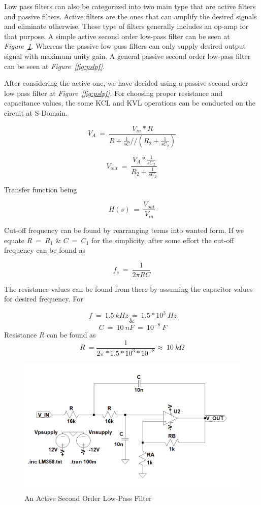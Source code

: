 \documentclass[paper]{IEEEtran}
\begin{document}
	Low pass filters can also be categorized into two main type that are active filters and passive filters. Active filters are the ones that can amplify the desired signals and eliminate otherwise. These type of filters generally includes an op-amp for that purpose.  A simple active second order low-pass filter can be seen at \textit{Figure~\ref{fig:lpf}}. Whereas the passive low pass filters can only supply desired output signal with maximum unity gain. A general passive second order low-pass filter can be seen at \textit{Figure~\ref{fig:pslpf}}.  		 

	After considering the active one, we have decided using a passive second order low pass filter at \textit{Figure~\ref{fig:pslpf}}. For choosing proper resistance and capacitance values, the some KCL and KVL operations can be conducted on the circuit at S-Domain.
	
	$$	V_A~=~\frac{V_{in}*R}{R+\frac{1}{sC}//(R_2+\frac{1}{sC_2})}	$$  	
	
	$$	V_{out}~=~\frac{V_A*\frac{1}{sC_2}}{R_2+\frac{1}{sC_2}}	$$	

	Transfer function being	
	
	$$ H(s)~=~\frac{V_{out}}{V_{in}}$$
	
	Cut-off frequency can be found by rearranging terms into wanted form. If we equate $R~=~R_1$ \& $C~=~C_1$ for the simplicity, after some effort the cut-off frequency can be found as
	
	$$	f_c ~=~ \frac{1}{2\pi RC}	$$
	
	The resistance values can be found from there by assuming the capacitor values for desired frequency. For 
	
	$$~f~=~1.5~kHz~=~1.5*10^3~Hz $$ 
	$$ \& $$ 
	$$~C~=~10~nF~=~10^{-8}~F$$
	Resistance $R$ can be found as
	$$ R~=\frac{1}{2\pi*1.5*10^3*10^{-8}}\approx~10~k\Omega $$
	
	


\begin{figure}[h!]
	\setlength{\unitlength}{\textwidth}
	\center 
	\includegraphics[width=0.5\unitlength]{lpf_v2.png}
	\caption{\label{fig:lpf}An Active Second Order Low-Pass Filter }
\end{figure} 
	
\end{document}

